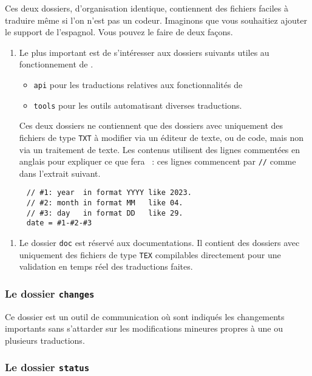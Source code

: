 \documentclass[10pt, a4paper]{../main/main}
\begin{document}
Ces deux dossiers, d'organisation identique, contiennent des fichiers faciles à traduire même si l'on n'est pas un codeur. Imaginons que vous souhaitiez ajouter le support de l'espagnol. Vous pouvez le faire de deux façons.
%
\begin{enumerate}
	\item Le plus important est de s'intéresser aux dossiers  suivants utiles au fonctionnement de \thisproj.
	\begin{itemize}
		\item \verb#api# pour les traductions relatives aux fonctionnalités de \thisproj
		
		\item \verb#tools# pour les outils automatisant diverses traductions.
	\end{itemize}
	
	Ces deux dossiers ne contiennent que des dossiers avec uniquement des fichiers de type \verb#TXT# à modifier via un éditeur de texte, ou de code, mais non via un traitement de texte.
	Les contenus utilisent des lignes commentées en anglais pour expliquer ce que fera \thisproj\ : ces lignes commencent par \verb#//# comme dans l'extrait suivant.
\end{enumerate}
	
\begin{verbatim}
     // #1: year  in format YYYY like 2023.
     // #2: month in format MM   like 04.
     // #3: day   in format DD   like 29.
     date = #1-#2-#3
\end{verbatim}


\begin{enumerate}[resume]
	\item Le dossier \verb#doc# est réservé aux documentations. Il contient des dossiers avec uniquement des fichiers de type \verb#TEX# compilables directement pour une validation en temps réel des traductions faites.
\end{enumerate}



\subsubsection{Le dossier \texttt{changes}}

Ce dossier est un outil de communication où sont indiqués les changements importants sans s'attarder sur les modifications mineures propres à une ou plusieurs traductions.



\subsubsection{Le dossier \texttt{status}}
\end{document}
